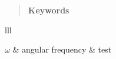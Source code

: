 \documentclass[11pt,
            english,
            oneside,
            liststotoc,
            singlespacing,
            headsepline,
            consistentlayout]{style}
\begin{document}

\begin{abstract}
\addchaptertocentry{\abstractname} %


\vfill
\noindent \textbf{Keywords}\textemdash\keywordnames
\end{abstract}


\begin{acknowledgements}
\addchaptertocentry{\acknowledgementname} %

\end{acknowledgements}


{
\hypersetup{linkcolor=black}
\tableofcontents %
\listoffigures %
\listoftables %
}

\begin{symbols}{lll} %



\addlinespace %

$\omega$ & angular frequency & test \\

\end{symbols}



\mainmatter %

\pagestyle{thesis} %
\end{document}
